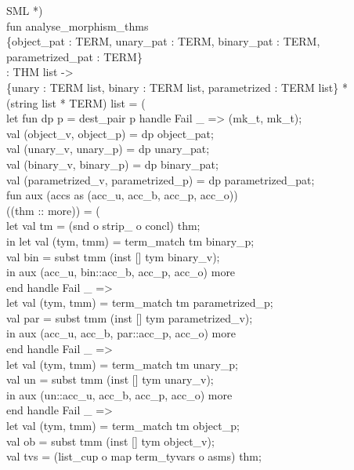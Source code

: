 \documentclass[11pt,a4paper]{article}
\begin{document}
\begin{GFT}{SML}
\+*)\\
\+fun \PrNL{}analyse\_morphism\_thms\PrNN{}\\
\+	\{object\_pat : TERM, unary\_pat : TERM, binary\_pat : TERM, parametrized\_pat : TERM\}\\
\+	: THM list ->\\
\+		\{unary : TERM list, binary : TERM list, parametrized : TERM list\} *\\
\+			(string list * TERM) list = (\\
\+	let	fun dp p = dest\_pair p handle Fail \_ => (mk\_t, mk\_t);\\
\+		val (object\_v, object\_p) = dp object\_pat;\\
\+		val (unary\_v, unary\_p) = dp unary\_pat;\\
\+		val (binary\_v, binary\_p) = dp binary\_pat;\\
\+		val (parametrized\_v, parametrized\_p) = dp parametrized\_pat;\\
\+		fun aux (accs as (acc\_u, acc\_b, acc\_p, acc\_o))\\
\+			((thm :: more)) = (\\
\+			let	val tm = (snd o strip\_\PrLF{} o concl) thm;\\
\+			in	let	val (tym, tmm) = term\_match tm binary\_p;\\
\+					val bin = subst tmm (inst [] tym binary\_v);\\
\+				in	aux (acc\_u, bin::acc\_b, acc\_p, acc\_o) more\\
\+				end	handle Fail \_ =>\\
\+				let	val (tym, tmm) = term\_match tm parametrized\_p;\\
\+					val par = subst tmm (inst [] tym parametrized\_v);\\
\+				in	aux (acc\_u, acc\_b, par::acc\_p, acc\_o) more\\
\+				end	handle Fail \_ =>\\
\+				let	val (tym, tmm) = term\_match tm unary\_p;\\
\+					val un = subst tmm (inst [] tym unary\_v);\\
\+				in	aux (un::acc\_u, acc\_b, acc\_p, acc\_o) more\\
\+				end	handle Fail \_ =>\\
\+				let	val (tym, tmm) = term\_match tm object\_p;\\
\+					val ob = subst tmm (inst [] tym object\_v);\\
\+					val tvs = (list\_cup o map term\_tyvars o asms) thm;\\

\end{GFT}
\end{document}
